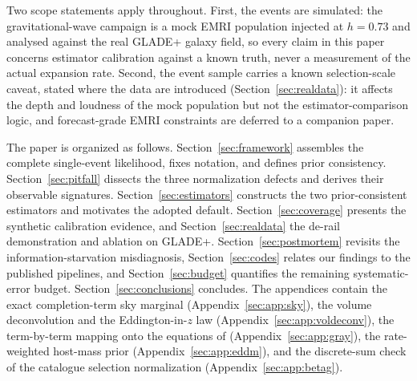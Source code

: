 Two scope statements apply throughout.  First, the events are
simulated: the gravitational-wave campaign is a mock EMRI population
injected at $h = 0.73$
and analysed against the real GLADE+ galaxy field, so every claim in
this paper concerns estimator calibration against a known truth,
never a measurement of the actual expansion rate.  Second, the event
sample carries a known selection-scale caveat, stated where the data
are introduced (Section~\ref{sec:realdata}): it affects the depth and
loudness of the mock population but not the estimator-comparison
logic, and forecast-grade EMRI constraints are deferred to a
companion paper.

The paper is organized as follows.  Section~\ref{sec:framework}
assembles the complete single-event likelihood, fixes notation, and
defines prior consistency.  Section~\ref{sec:pitfall} dissects the
three normalization defects and derives their observable signatures.
Section~\ref{sec:estimators} constructs the two prior-consistent
estimators and motivates the adopted default.
Section~\ref{sec:coverage} presents the synthetic calibration
evidence, and Section~\ref{sec:realdata} the de-rail demonstration
and ablation on GLADE+.  Section~\ref{sec:postmortem} revisits the
information-starvation misdiagnosis, Section~\ref{sec:codes} relates
our findings to the published pipelines, and Section~\ref{sec:budget}
quantifies the remaining systematic-error budget.
Section~\ref{sec:conclusions} concludes.  The appendices contain the
exact completion-term sky marginal (Appendix~\ref{sec:app:sky}), the
volume deconvolution and the Eddington-in-$z$ law
(Appendix~\ref{sec:app:voldeconv}), the term-by-term mapping onto the
equations of \citet{Gray:2019ksv} (Appendix~\ref{sec:app:gray}), the
rate-weighted host-mass prior (Appendix~\ref{sec:app:eddm}), and the
discrete-sum check of the catalogue selection normalization
(Appendix~\ref{sec:app:betag}).
